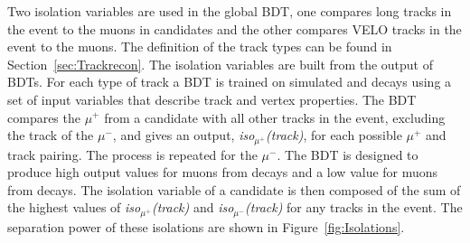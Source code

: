 Two isolation variables are used in the global BDT, one compares long tracks in the event to the muons in \bsmumu candidates and the other compares VELO tracks in the event to the muons. The definition of the track types can be found in Section~\ref{sec:Trackrecon}. The isolation variables are built from the output of BDTs. For each type of track a BDT is trained on simulated \bsmumu and \bbbarmumux decays using a set of input variables that describe track and vertex properties. The BDT compares the $\mu^{+}$ from a \bsmumu candidate with all other tracks in the event, excluding the track of the $\mu^{-}$, and gives an output, {\it iso$_{\mu^{+}}$(track)}, for each possible $\mu^{+}$ and track pairing. The process is repeated for the $\mu^{-}$. The BDT is designed to produce high output values for muons from \bbbarmumux decays and a low value for muons from \bsmumu decays. The isolation variable of a \bsmumu candidate is then composed of the sum of the highest values of {\it iso$_{\mu^{+}}$(track)} and {\it iso$_{\mu^{-}}$(track)} for any tracks in the event. The separation power of these isolations are shown in Figure~\ref{fig:Isolations}. %

